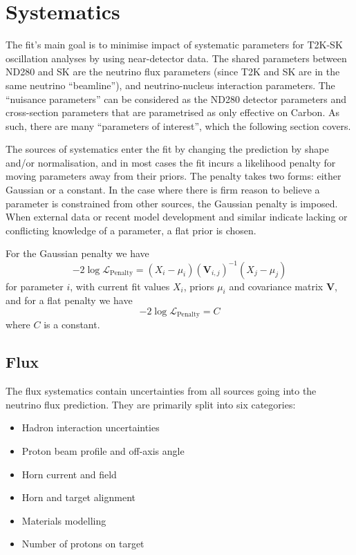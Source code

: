 \section{Systematics}
\label{sec:syst}
The fit's main goal is to minimise impact of systematic parameters for T2K-SK oscillation analyses by using near-detector data. The shared parameters between ND280 and SK are the neutrino flux parameters (since T2K and SK are in the same neutrino ``beamline''), and neutrino-nucleus interaction parameters. The ``nuisance parameters'' can be considered as the ND280 detector parameters and cross-section parameters that are parametrised as only effective on Carbon. As such, there are many ``parameters of interest'', which the following section covers.

The sources of systematics enter the fit by changing the prediction by shape and/or normalisation, and in most cases the fit incurs a likelihood penalty for moving parameters away from their priors. The penalty takes two forms: either Gaussian or a constant. In the case where there is firm reason to believe a parameter is constrained from other sources, the Gaussian penalty is imposed. When external data or recent model development and similar indicate lacking or conflicting knowledge of a parameter, a flat prior is chosen.

For the Gaussian penalty we have
\begin{equation}
	-2\log\mathcal{L}_\text{Penalty} = (X_i-\mu_i) \left(\mathbf{V}_{i,j}\right)^{-1} (X_j-\mu_j)
\end{equation}
for parameter $i$, with current fit values $X_i$, priors $\mu_i$ and covariance matrix $\mathbf{V}$, and for a flat penalty we have
\begin{equation}
	-2\log\mathcal{L}_\text{Penalty} = C
\end{equation}
where $C$ is a constant.

\subsection{Flux}
\label{subsec:syst_flux}
The flux systematics contain uncertainties from all sources going into the neutrino flux prediction. They are primarily split into six categories:
\begin{itemize}
	\item Hadron interaction uncertainties
	\item Proton beam profile and off-axis angle
	\item Horn current and field
	\item Horn and target alignment
	\item Materials modelling
	\item Number of protons on target
\end{itemize}

